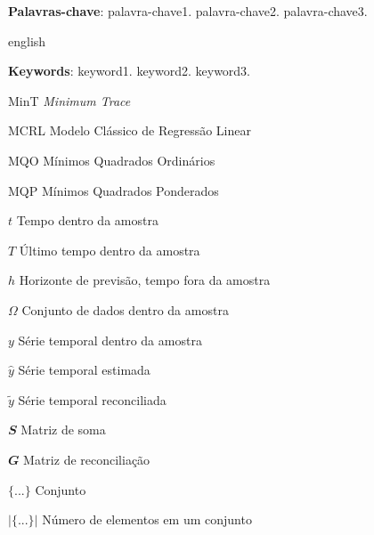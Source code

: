 
\setlength{\absparsep}{18pt}
\begin{resumo}
  \lipsum[30]

  \textbf{Palavras-chave}: palavra-chave1. palavra-chave2. palavra-chave3.
\end{resumo}

\begin{resumo}[Abstract]
  \begin{otherlanguage*}{english}
    \lipsum[30]

    \vspace{\onelineskip}
 
    \noindent 
    \textbf{Keywords}: keyword1. keyword2. keyword3.
  \end{otherlanguage*}
\end{resumo}

\listoffigures*
\cleardoublepage

\listofquadros*
\cleardoublepage

\listoftables*
\cleardoublepage

\begin{siglas}
  \item[MinT] \textit{Minimum Trace}
  \item[MCRL] Modelo Clássico de Regressão Linear
  \item[MQO] Mínimos Quadrados Ordinários
  \item[MQP] Mínimos Quadrados Ponderados
\end{siglas}

\begin{simbolos}
  \item[$ t $] Tempo dentro da amostra
  \item[$ T $] Último tempo dentro da amostra
  \item[$ h $] Horizonte de previsão, tempo fora da amostra
  \item[$ \Omega $] Conjunto de dados dentro da amostra
  \item[$ y $] Série temporal dentro da amostra
  \item[$ \hat{y} $] Série temporal estimada
  \item[$ \tilde{y} $] Série temporal reconciliada
  \item[$ \mathbfit{S} $] Matriz de soma
  \item[$ \mathbfit{G} $] Matriz de reconciliação
  \item[$\{...\}$] Conjunto
  \item[$|\{...\}|$] Número de elementos em um conjunto
\end{simbolos}

\tableofcontents*
\cleardoublepage

\textual